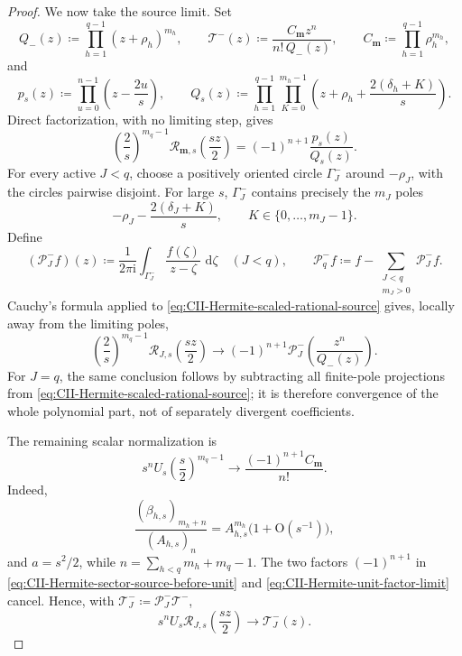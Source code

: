 \documentclass[10pt]{amsart}
\newcommand{\dd}{\,\mathrm d}
\newcommand{\mm}{\boldsymbol m}
\theoremstyle{plain}
\theoremstyle{definition}
\theoremstyle{remark}
\begin{document}
\begin{proof}
We now take the source limit.  Set
\[
 Q_-(z)\coloneq\prod_{h=1}^{q-1}(z+\rho_h)^{m_h},\qquad
 \mathcal T^-(z)\coloneq
 \frac{C_{\mm}z^n}{n!\,Q_-(z)},\qquad
 C_{\mm}\coloneq\prod_{h=1}^{q-1}\rho_h^{m_h},
\]
and
\[
 p_s(z)\coloneq\prod_{u=0}^{n-1}\left(z-\frac{2u}{s}\right),
 \qquad
 Q_s(z)\coloneq
 \prod_{h=1}^{q-1}\prod_{K=0}^{m_h-1}
 \left(z+\rho_h+\frac{2(\delta_h+K)}s\right).
\]
Direct factorization, with no limiting step, gives
\begin{equation}
 \left(\frac2s\right)^{m_q-1}
 \mathcal R_{\mm,s}\left(\frac{sz}{2}\right)
 =(-1)^{n+1}\frac{p_s(z)}{Q_s(z)}.
 \label{eq:CII-Hermite-scaled-rational-source}
\end{equation}
For every active \(J<q\), choose a positively oriented circle
\(\Gamma_J^-\) around \(-\rho_J\), with the circles pairwise disjoint.
For large \(s\), \(\Gamma_J^-\) contains precisely the \(m_J\) poles
\[
 -\rho_J-\frac{2(\delta_J+K)}s,
 \qquad K\in\{0,\ldots,m_J-1\}.
\]
Define
\[
 (\mathcal P_J^-f)(z)\coloneq
 \frac{1}{2\pi\mathrm i}\int_{\Gamma_J^-}
 \frac{f(\zeta)}{z-\zeta}\,\dd\zeta
 \quad(J<q),\qquad
 \mathcal P_q^-f\coloneq
 f-\sum_{\substack{J<q\\m_J>0}}\mathcal P_J^-f .
\]
Cauchy's formula applied to
\eqref{eq:CII-Hermite-scaled-rational-source} gives, locally away from
the limiting poles,
\begin{equation}
 \left(\frac2s\right)^{m_q-1}
 \mathcal R_{J,s}\left(\frac{sz}{2}\right)
 \longrightarrow
 (-1)^{n+1}\mathcal P_J^-
 \left(\frac{z^n}{Q_-(z)}\right).
 \label{eq:CII-Hermite-sector-source-before-unit}
\end{equation}
For \(J=q\), the same conclusion follows by subtracting all finite-pole
projections from \eqref{eq:CII-Hermite-scaled-rational-source}; it is
therefore convergence of the whole polynomial part, not of separately
divergent coefficients.

The remaining scalar normalization is
\begin{equation}
 s^nU_s\left(\frac{s}{2}\right)^{m_q-1}
 \longrightarrow
 \frac{(-1)^{n+1}C_{\mm}}{n!}.
 \label{eq:CII-Hermite-unit-factor-limit}
\end{equation}
Indeed,
\[
 \frac{(\beta_{h,s})_{m_h+n}}{(A_{h,s})_n}
 =A_{h,s}^{m_h}\bigl(1+\mathrm O(s^{-1})\bigr),
\]
and \(a=s^2/2\), while \(n=\sum_{h<q}m_h+m_q-1\).
The two factors \((-1)^{n+1}\) in
\eqref{eq:CII-Hermite-sector-source-before-unit} and
\eqref{eq:CII-Hermite-unit-factor-limit} cancel.  Hence, with
\(\mathcal T_J^-\coloneq\mathcal P_J^-\mathcal T^-\),
\begin{equation}
 s^nU_s\mathcal R_{J,s}\left(\frac{sz}{2}\right)
 \longrightarrow\mathcal T_J^-(z).
 \label{eq:CII-Hermite-unit-sector-source-limit}
\end{equation}


\end{proof}
\end{document}

